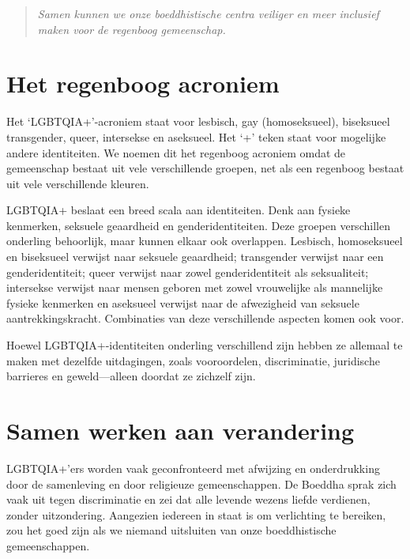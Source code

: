 \documentclass[12pt,openany]{book}
\begin{document}
\begin{quote}
\textit{Samen kunnen we onze boeddhistische centra veiliger en meer inclusief maken voor de regenboog gemeenschap.}
\end{quote}

\section*{Het regenboog acroniem}

Het ‘LGBTQIA+’-acroniem staat voor lesbisch, gay (homoseksueel), biseksueel transgender, queer, intersekse en aseksueel. Het ‘+’ teken staat voor mogelijke andere identiteiten. We noemen dit het regenboog acroniem omdat de gemeenschap bestaat uit vele verschillende groepen, net als een regenboog bestaat uit vele verschillende kleuren. 

LGBTQIA+ beslaat een breed scala aan identiteiten. Denk aan fysieke kenmerken, seksuele geaardheid en genderidentiteiten. Deze groepen verschillen onderling behoorlijk, maar kunnen elkaar ook overlappen. Lesbisch, homoseksueel en biseksueel verwijst naar seksuele geaardheid; transgender verwijst naar een genderidentiteit; queer verwijst naar zowel genderidentiteit als seksualiteit; intersekse verwijst naar mensen geboren met zowel vrouwelijke als mannelijke fysieke kenmerken en aseksueel verwijst naar de afwezigheid van seksuele aantrekkingskracht. Combinaties van deze verschillende aspecten komen ook voor. 

Hoewel LGBTQIA+-identiteiten onderling verschillend zijn hebben ze allemaal te maken met dezelfde uitdagingen, zoals vooroordelen, discriminatie, juridische barrieres en geweld—alleen doordat ze zichzelf zijn.

\section*{Samen werken aan verandering}

LGBTQIA+’ers worden vaak geconfronteerd met afwijzing en onderdrukking door de samenleving en door religieuze gemeenschappen. De Boeddha  sprak zich vaak uit tegen discriminatie en zei dat alle levende wezens liefde verdienen, zonder uitzondering. Aangezien iedereen in staat is om verlichting te bereiken, zou het goed zijn als we niemand uitsluiten van onze boeddhistische gemeenschappen.  
\end{document}
